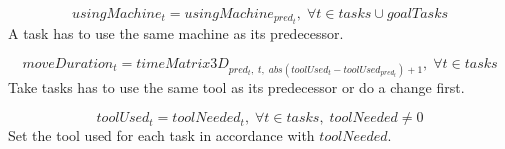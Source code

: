\documentclass[10pt,a4paper]{report}
\begin{document}
\begin{equation}\label{eq:115}
usingMachine_t = usingMachine_{pred_t}, \; \forall t \in tasks \cup goalTasks\end{equation}
A task has to use the same machine as its predecessor.

\begin{equation}\label{eq:116}
moveDuration_t = timeMatrix3D_{pred_t, \; t, \; abs(toolUsed_t - toolUsed_{pred_t}) + 1}, \; \forall t \in tasks\end{equation}
Take tasks has to use the same tool as its predecessor or do a change first.

\begin{equation}\label{eq:117}
toolUsed_t = toolNeeded_t, \; \forall t \in tasks, \; toolNeeded \neq 0\end{equation}
Set the tool used for each task in accordance with $toolNeeded$.
\end{document}
